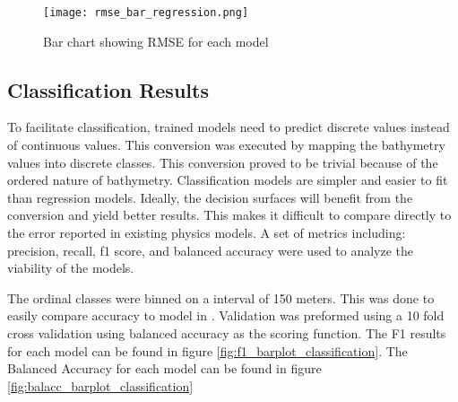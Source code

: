\begin{figure}[h]
    \centering
    \texttt{[image: rmse\_bar\_regression.png]} 
    \caption{Bar chart showing RMSE for each model}
    \label{fig:rmse_barplot_regression}
\end{figure}


\subsection{Classification Results}
\setlength{\parindent}{10ex}
To facilitate classification, trained models need to predict discrete values instead of continuous values.
This conversion was executed by mapping the bathymetry values into discrete classes.
This conversion proved to be trivial because of the ordered nature of bathymetry.
Classification models are simpler and easier to fit than regression models.
Ideally, the decision surfaces will benefit from the conversion and yield better results.
This makes it difficult to compare directly to the error reported in existing physics models.
A set of metrics including: precision, recall, f1 score, and balanced accuracy were used to analyze the viability of the models.

\par
The ordinal classes were binned on a interval of 150 meters.
This was done to easily compare accuracy to model in \cite{jena2012prediction}.
Validation was preformed using a 10 fold cross validation using balanced accuracy as the scoring function.
The F1 results for each model can be found in figure \ref{fig:f1_barplot_classification}.
The Balanced Accuracy for each model can be found in figure \ref{fig:balacc_barplot_classification}


